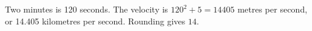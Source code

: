 Two minutes is 120 seconds. The velocity is $120^2+5=14405$ metres per second, or 14.405 kilometres per second. Rounding gives $\boxed{14}$.
